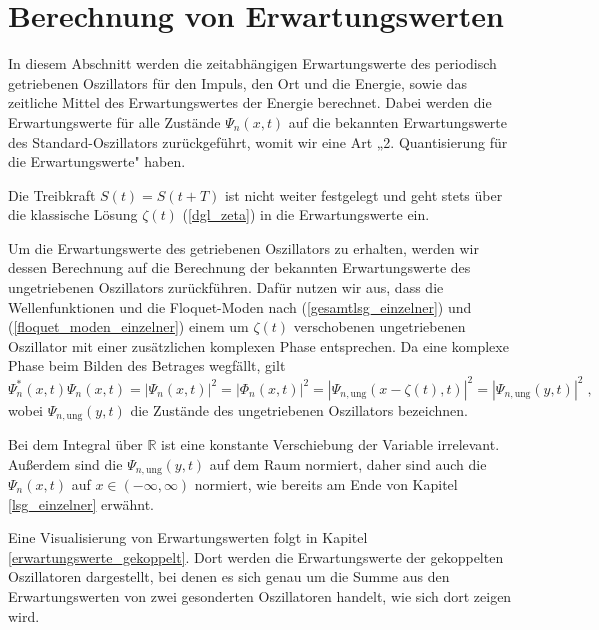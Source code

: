 

\chapter{Berechnung von Erwartungswerten}
\label{3}
  In diesem Abschnitt werden die zeitabhängigen Erwartungswerte des periodisch getriebenen Oszillators für den Impuls, den Ort und die Energie, sowie das zeitliche Mittel des Erwartungswertes der Energie berechnet.
  Dabei werden die Erwartungswerte für alle Zustände $\Psi_n(x,t)$ auf die bekannten Erwartungswerte des Standard-Oszillators zurückgeführt, womit wir eine Art „2. Quantisierung für die Erwartungswerte" haben.

  Die Treibkraft $S(t)=S(t+T)$ ist nicht weiter festgelegt und geht stets über die klassische Lösung $\zeta(t)$ (\ref{dgl_zeta}) in die Erwartungswerte ein.

  Um die Erwartungswerte des getriebenen Oszillators zu erhalten, werden wir dessen Berechnung auf die Berechnung der bekannten Erwartungswerte des ungetriebenen Oszillators zurückführen.
  Dafür nutzen wir aus, dass die Wellenfunktionen und die Floquet-Moden nach (\ref{gesamtlsg_einzelner}) und (\ref{floquet_moden_einzelner}) einem um $\zeta(t)$ verschobenen ungetriebenen Oszillator mit einer zusätzlichen komplexen Phase entsprechen.
  Da eine komplexe Phase beim Bilden des Betrages wegfällt, gilt
  \begin{equation}
    \Psi_n^*(x,t)\Psi_n(x,t) = |\Psi_n(x,t)|^2 = |\Phi_n(x,t)|^2 = |\Psi_{n,\text{ung}}(x-\zeta(t),t)|^2 = |\Psi_{n,\text{ung}}(y,t)|^2 \; ,
    \label{betrag_einzelner}
  \end{equation}
  wobei $\Psi_{n,\text{ung}}(y,t)$ die Zustände des ungetriebenen Oszillators bezeichnen.

  Bei dem Integral über $\mathbb{R}$ ist eine konstante Verschiebung der Variable irrelevant.
  Außerdem sind die $\Psi_{n,\text{ung}}(y,t)$ auf dem Raum normiert, daher sind auch die $\Psi_n(x,t)$ auf $x \in (-\infty,\infty)$ normiert, wie bereits am Ende von Kapitel \ref{lsg_einzelner} erwähnt.

  Eine Visualisierung von Erwartungswerten folgt in Kapitel \ref{erwartungswerte_gekoppelt}.
  Dort werden die Erwartungswerte der gekoppelten Oszillatoren dargestellt, bei denen es sich genau um die Summe aus den Erwartungswerten von zwei gesonderten Oszillatoren handelt, wie sich dort zeigen wird.

